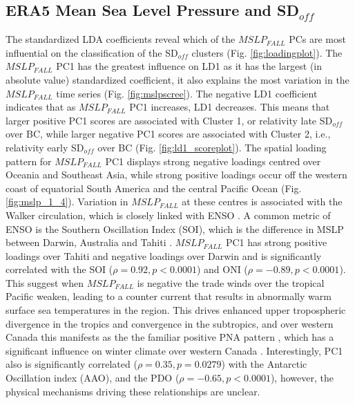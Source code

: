 \documentclass{tATO2e}
\newcommand{\sdoff}{SD$_{off}$}
\begin{document}
\subsection{ERA5 Mean Sea Level Pressure and \sdoff{}}
The standardized LDA coefficients reveal which of the $MSLP_{FALL}$ PCs are most influential on the classification of the \sdoff{} clusters (Fig. \ref{fig:loadingplot}). The $MSLP_{FALL}$ PC1 has the greatest influence on LD1 as it has the largest (in absolute value) standardized coefficient, it also explains the most variation in the $MSLP_{FALL}$ time series (Fig. \ref{fig:mslpscree}). The negative LD1 coefficient indicates that as $MSLP_{FALL}$ PC1 increases, LD1 decreases. This means that larger positive PC1 scores are associated with Cluster 1, or relativity late \sdoff{} over BC, while larger negative PC1 scores are associated with Cluster 2, i.e., relativity early \sdoff{} over BC (Fig. \ref{fig:ld1_scoreplot}). The spatial loading pattern for $MSLP_{FALL}$ PC1 displays strong negative loadings centred over Oceania and Southeast Asia, while strong positive loadings occur off the western coast of equatorial South America and the central Pacific Ocean (Fig. \ref{fig:mslp_1_4}). Variation in $MSLP_{FALL}$ at these centres is associated with the Walker circulation, which is closely linked with ENSO \citep{Horel1981}. A common metric of ENSO is the Southern Oscillation Index (SOI), which is the difference in MSLP between Darwin, Australia and Tahiti \citep{Trenberth1976}. $MSLP_{FALL}$ PC1 has strong positive loadings over Tahiti and negative loadings over Darwin and is significantly correlated with the SOI ($\rho = 0.92, p < 0.0001$) and ONI ($\rho = -0.89, p < 0.0001$). This suggest when $MSLP_{FALL}$ is negative the trade winds over the tropical Pacific weaken, leading to a counter current that results in abnormally warm surface sea temperatures in the region. This drives enhanced upper tropospheric divergence in the tropics and convergence in the subtropics, and over  western  Canada this manifests as the the familiar positive PNA pattern \citep{Horel1981}, which has a significant influence on winter climate over western Canada \citep{Shabbar2006-ek}.  Interestingly, PC1 also is significantly correlated ($\rho = 0.35, p = 0.0279$) with the Antarctic Oscillation index (AAO), and the PDO ($\rho = -0.65, p < 0.0001$), however, the physical mechanisms driving these relationships are unclear.
\par
\end{document}
